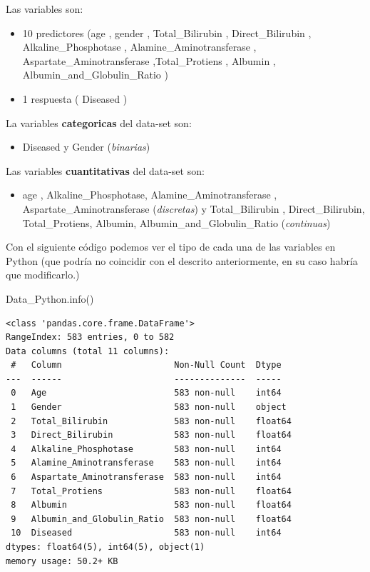 \documentclass[
  11pt,
  a4paper,
]{article}
\newenvironment{Shaded}{\begin{snugshade}}{\end{snugshade}}
\newcommand{\NormalTok}[1]{#1}
\providecommand{\tightlist}{%
  \setlength{\itemsep}{0pt}\setlength{\parskip}{0pt}}
\begin{document}
Las variables son:

\begin{itemize}
\item
  10 predictores (age , gender , Total\_Bilirubin , Direct\_Bilirubin ,
  Alkaline\_Phosphotase , Alamine\_Aminotransferase ,
  Aspartate\_Aminotransferase ,Total\_Protiens , Albumin ,
  Albumin\_and\_Globulin\_Ratio )
\item
  1 respuesta ( Diseased )
\end{itemize}

La variables \textbf{categoricas} del data-set son:

\begin{itemize}
\tightlist
\item
  Diseased y Gender (\emph{binarias})
\end{itemize}

Las variables \textbf{cuantitativas} del data-set son:

\begin{itemize}
\tightlist
\item
  age , Alkaline\_Phosphotase, Alamine\_Aminotransferase ,
  Aspartate\_Aminotransferase (\emph{discretas}) y Total\_Bilirubin ,
  Direct\_Bilirubin, Total\_Protiens, Albumin,
  Albumin\_and\_Globulin\_Ratio (\emph{continuas})
\end{itemize}

\newpage

Con el siguiente código podemos ver el tipo de cada una de las variables
en Python (que podría no coincidir con el descrito anteriormente, en su
caso habría que modificarlo.)

\begin{Shaded}
\begin{Highlighting}[]
\NormalTok{Data\_Python.info()}
\end{Highlighting}
\end{Shaded}

\begin{verbatim}
<class 'pandas.core.frame.DataFrame'>
RangeIndex: 583 entries, 0 to 582
Data columns (total 11 columns):
 #   Column                      Non-Null Count  Dtype  
---  ------                      --------------  -----  
 0   Age                         583 non-null    int64  
 1   Gender                      583 non-null    object 
 2   Total_Bilirubin             583 non-null    float64
 3   Direct_Bilirubin            583 non-null    float64
 4   Alkaline_Phosphotase        583 non-null    int64  
 5   Alamine_Aminotransferase    583 non-null    int64  
 6   Aspartate_Aminotransferase  583 non-null    int64  
 7   Total_Protiens              583 non-null    float64
 8   Albumin                     583 non-null    float64
 9   Albumin_and_Globulin_Ratio  583 non-null    float64
 10  Diseased                    583 non-null    int64  
dtypes: float64(5), int64(5), object(1)
memory usage: 50.2+ KB
\end{verbatim}
\end{document}
